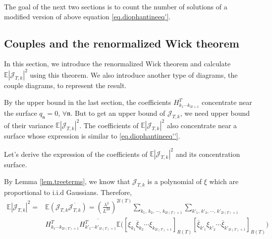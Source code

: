 The goal of the next two sections is to count the number of solutions of a modified version of above equation \eqref{eq.diophantineeq'}. 

\subsection{Couples and the renormalized Wick theorem} \label{sec.coupwick} In this section, we introduce the renormalized Wick theorem and calculate $\mathbb{E}|\mathcal{J}_{T,k}|^2$ using this theorem. We also introduce another type of diagrams, the couple diagrams, to represent the result.


By the upper bound in the last section, the coefficients $H^T_{k_1\cdots k_{2l+1}}$ concentrate near the surface $q_{\mathfrak{n}}=0$, $\forall \mathfrak{n}$. But to get an upper bound of $\mathcal{J}_{T,k}$, we need upper bound of their variance $\mathbb{E}|\mathcal{J}_{T,k}|^2$. The coefficients of $\mathbb{E}|\mathcal{J}_{T,k}|^2$ also concentrate near a surface whose expression is similar to \eqref{eq.diophantineeq''}. 

Let's derive the expression of the coefficients of $\mathbb{E}|\mathcal{J}_{T,k}|^2$ and its concentration surface.



By Lemma \ref{lem.treeterms}, we know that $\mathcal{J}_{T,k}$ is a polynomial of $\xi$ which are proportional to i.i.d Gaussians. Therefore, 
\begin{equation}\label{eq.termexp1}
\begin{split}
    \mathbb{E}|\mathcal{J}_{T,k}|^2=&\mathbb{E}(\mathcal{J}_{T,k}\overline{\mathcal{J}_{T,k}})=\left(\frac{\lambda^2}{L^{2d}}\right)^{2l(T)}
    \sum_{k_1,\, k_2,\, \cdots,\, k_{2l(T)+1}}\sum_{k'_1,\, k'_2,\, \cdots,\, k'_{2l(T)+1}}
    \\[0.5em]
    & H^T_{k_1\cdots k_{2l(T)+1}} \overline{H^{T}_{k'_1\cdots k'_{2l(T)+1}}}  \mathbb{E}\Big([\xi_{k_1}\bar{\xi}_{k_2}\cdots\xi_{k_{2l(T)+1}}]_{R(T)}
    [\bar{\xi}_{k'_1}\xi_{k'_2}\cdots\bar{\xi}_{k'_{2l(T)+1}}]_{R(T)}\Big)
\end{split}
\end{equation}

